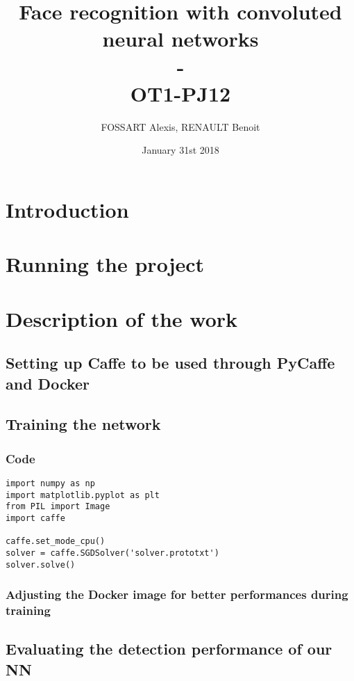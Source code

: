 \documentclass[french]{article}
\title{Face recognition with convoluted neural networks
\\-
\\OT1-PJ12}
\author{FOSSART Alexis, RENAULT Benoit}
\date{January 31st 2018}
\begin{document}
\maketitle

\medskip

\tableofcontents

\newpage

\section{Introduction}

\section{Running the project}



\section{Description of the work}



\subsection{Setting up Caffe to be used through PyCaffe and Docker}

\subsection{Training the network}

\subsubsection{Code}

\begin{verbatim}
import numpy as np
import matplotlib.pyplot as plt
from PIL import Image
import caffe

caffe.set_mode_cpu()
solver = caffe.SGDSolver('solver.prototxt')
solver.solve()
\end{verbatim}

\subsubsection{Adjusting the Docker image for better performances during training}

\subsection{Evaluating the detection performance of our NN}
\end{document}
